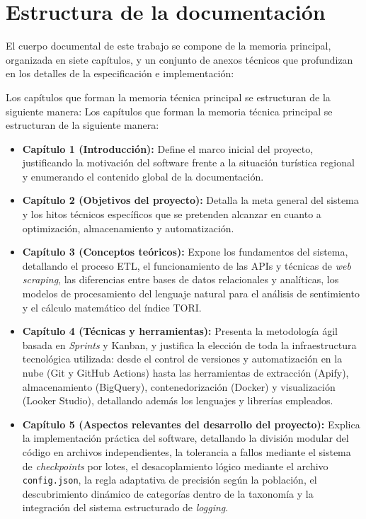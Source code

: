 \section{Estructura de la documentación}
El cuerpo documental de este trabajo se compone de la memoria principal, organizada en siete capítulos, y un conjunto de anexos técnicos que profundizan en los detalles de la especificación e implementación:

Los capítulos que forman la memoria técnica principal se estructuran de la siguiente manera:
Los capítulos que forman la memoria técnica principal se estructuran de la siguiente manera:
\begin{itemize}
    \item \textbf{Capítulo 1 (Introducción):} Define el marco inicial del proyecto, justificando la motivación del software frente a la situación turística regional y enumerando el contenido global de la documentación.
    \item \textbf{Capítulo 2 (Objetivos del proyecto):} Detalla la meta general del sistema y los hitos técnicos específicos que se pretenden alcanzar en cuanto a optimización, almacenamiento y automatización.
    \item \textbf{Capítulo 3 (Conceptos teóricos):} Expone los fundamentos del sistema, detallando el proceso ETL, el funcionamiento de las APIs y técnicas de \textit{web scraping}, las diferencias entre bases de datos relacionales y analíticas, los modelos de procesamiento del lenguaje natural para el análisis de sentimiento y el cálculo matemático del índice TORI.
    \item \textbf{Capítulo 4 (Técnicas y herramientas):} Presenta la metodología ágil basada en \textit{Sprints} y Kanban, y justifica la elección de toda la infraestructura tecnológica utilizada: desde el control de versiones y automatización en la nube (Git y GitHub Actions) hasta las herramientas de extracción (Apify), almacenamiento (BigQuery), contenedorización (Docker) y visualización (Looker Studio), detallando además los lenguajes y librerías empleados.
    \item \textbf{Capítulo 5 (Aspectos relevantes del desarrollo del proyecto):} Explica la implementación práctica del software, detallando la división modular del código en archivos independientes, la tolerancia a fallos mediante el sistema de \textit{checkpoints} por lotes, el desacoplamiento lógico mediante el archivo \texttt{config.json}, la regla adaptativa de precisión según la población, el descubrimiento dinámico de categorías dentro de la taxonomía y la integración del sistema estructurado de \textit{logging}.

\end{itemize}
